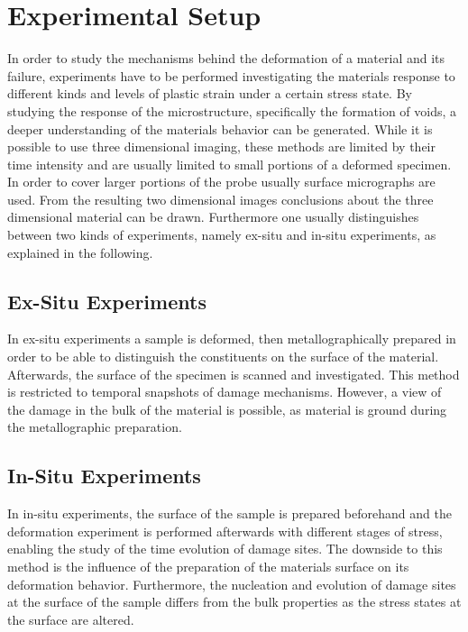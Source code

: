 \section{Experimental Setup}

In order to study the mechanisms behind the deformation of a material and its failure, experiments have to be performed investigating the materials response to different kinds and levels of plastic strain under a certain stress state. By studying the response of the microstructure, specifically the formation of voids, a deeper understanding of the materials behavior can be generated. While it is possible to use three dimensional imaging, these methods are limited by their time intensity and are usually limited to small portions of a deformed specimen. In order to cover larger portions of the probe usually surface micrographs are used. From the resulting two dimensional images conclusions about the three dimensional material can be drawn. Furthermore one usually distinguishes between two kinds of experiments, namely ex-situ and in-situ experiments, as explained in the following. \\
 
\subsection{Ex-Situ Experiments}

In ex-situ experiments a sample is deformed, then metallographically prepared in order to be able to distinguish the constituents on the surface of the material. Afterwards, the surface of the specimen is scanned and investigated. This method is restricted to temporal snapshots of damage mechanisms. However, a view of the damage in the bulk of the material is possible, as material is ground during the metallographic preparation. %

\subsection{In-Situ Experiments}

In in-situ experiments, the surface of the sample is prepared beforehand and the deformation experiment is performed afterwards with different stages of stress, enabling the study of the time evolution of damage sites. The downside to this method is the influence of the preparation of the materials surface on its deformation behavior. Furthermore, the nucleation and evolution of damage sites at the surface of the sample differs from the bulk properties as the stress states at the surface are altered. \\ %


